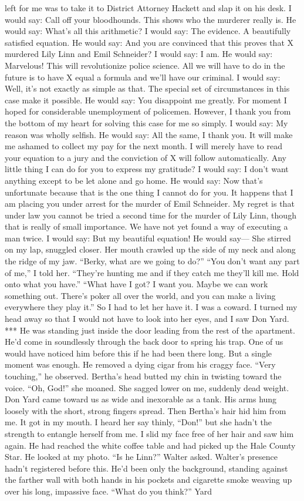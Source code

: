 \documentclass{novel}
\begin{document}
left for me was to take it to District Attorney Hackett and slap it on his desk. I would say: Call off your bloodhounds. This shows who the murderer really is. He would say: What’s all this arithmetic? I would say: The evidence. A beautifully satisfied equation. He would say: And you are convinced that this proves that X murdered Lily Linn and Emil Schneider? I would say: I am. He would say: Marvelous! This will revolutionize police science. All we will have to do in the future is to have X equal a formula and we’ll have our criminal. I would say: Well, it’s not exactly as simple as that. The special set of circumstances in this case make it possible. He would say: You disappoint me greatly. For moment I hoped for considerable unemployment of policemen. However, I thank you from the bottom of my heart for solving this case for me so simply. I would say: My reason was wholly selfish. He would say: All the same, I thank you. It will make me ashamed to collect my pay for the next month. I will merely have to read your equation to a jury and the conviction of X will follow automatically. Any little thing I can do for you to express my gratitude? I would say: I don’t want anything except to be let alone and go home. He would say: Now that’s unfortunate because that is the one thing I cannot do for you. It happens that I am placing you under arrest for the murder of Emil Schneider. My regret is that under law you cannot be tried a second time for the murder of Lily Linn, though that is really of small importance. We have not yet found a way of executing a man twice. I would say: But my beautiful equation! He would say— She stirred on my lap, snuggled closer. Her mouth crawled up the side of my neck and along the ridge of my jaw. “Berky, what are we going to do?” “You don’t want any part of me,” I told her. “They’re hunting me and if they catch me they’ll kill me. Hold onto what you have.” “What have I got? I want you. Maybe we can work something out. There’s poker all over the world, and you can make a living everywhere they play it.” So I had to let her have it. I was a coward. I turned my head away so that I would not have to look into her eyes, and I saw Don Yard. *** He was standing just inside the door leading from the rest of the apartment. He’d come in soundlessly through the back door to spring his trap. One of us would have noticed him before this if he had been there long. But a single moment was enough. He removed a dying cigar from his craggy face. “Very touching,” he observed. Bertha’s head butted my chin in twisting toward the voice. “Oh, God!” she moaned. She sagged lower on me, suddenly dead weight. Don Yard came toward us as wide and inexorable as a tank. His arms hung loosely with the short, strong fingers spread. Then Bertha’s hair hid him from me. It got in my mouth. I heard her say thinly, “Don!” but she hadn’t the strength to entangle herself from me. I slid my face free of her hair and saw him again. He had reached the white coffee table and had picked up the Hale County Star. He looked at my photo. “Is he Linn?” Walter asked. Walter’s presence hadn’t registered before this. He’d been only the background, standing against the farther wall with both hands in his pockets and cigarette smoke weaving up over his long, impassive face. “What do you think?” Yard 
\end{document}
